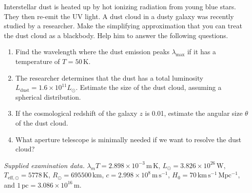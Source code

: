 Interstellar dust is heated up by hot ionizing radiation from young blue stars. They then re-emit the UV light.
A dust cloud in a dusty galaxy was recently studied by a researcher. Make the simplifying approximation that you can treat the dust cloud as a blackbody. Help him to answer the following questions.
\begin{enumerate}
\item Find the wavelength where the dust emission peaks $\lambda_{\max}$ if it has a temperature of $T=50\,\mathrm{K}$.
\item The researcher determines that the dust has a total luminosity $L_{\mathrm{dust}}=1.6\times10^{11}L_\odot$. Estimate the size of the dust cloud, assuming a spherical distribution.
\item If the cosmological redshift of the galaxy $z$ is 0.01, estimate the angular size $\theta$ of the dust cloud.
\item What aperture telescope is minimally needed if we want to resolve the dust cloud?
\end{enumerate}
\textit{Supplied examination data.} $\lambda_mT=2.898\times10^{-3}\,\mathrm{m\,K}$, $L_\odot=3.826\times10^{26}\,\mathrm{W}$, $T_{\mathrm{eff},\odot}=5778\,\mathrm{K}$, $R_\odot=695500\,\mathrm{km}$, $c=2.998\times10^8\,\mathrm{m\,s^{-1}}$, $H_0=70\,\mathrm{km\,s^{-1}\,Mpc^{-1}}$, and $1\,\mathrm{pc}=3.086\times10^{16}\,\mathrm{m}$.
